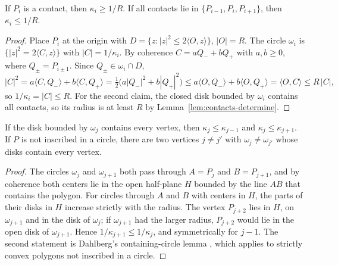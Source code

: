 \begin{lemma}\label{lem:contact-comparison}
If $P_i$ is a contact, then $\kappa_i\ge1/R$. If all contacts lie in
$\{P_{i-1},P_i,P_{i+1}\}$, then $\kappa_i\le1/R$.
\end{lemma}

\begin{proof}
Place $P_i$ at the origin with $D=\{z: |z|^2\le 2\langle O,z\rangle\}$,
$|O|=R$. The circle $\omega_i$ is $\{|z|^2=2\langle C,z\rangle\}$ with $|C|=1/\kappa_i$.
By coherence $C=aQ_-+bQ_+$ with $a,b\ge0$, where $Q_\pm=P_{i\pm1}$. Since
$Q_\pm\in\omega_i\cap D$,
\[
  |C|^2=a\langle C,Q_-\rangle+b\langle C,Q_+\rangle
  =\tfrac12\bigl(a|Q_-|^2+b|Q_+|^2\bigr)
  \le a\langle O,Q_-\rangle+b\langle O,Q_+\rangle=\langle O,C\rangle\le R\,|C| ,
\]
so $1/\kappa_i=|C|\le R$. For the second claim, the closed disk bounded by
$\omega_i$ contains all contacts, so its radius is at least $R$ by
Lemma~\ref{lem:contacts-determine}.
\end{proof}

\begin{lemma}\label{lem:containing}
If the disk bounded by $\omega_j$ contains every vertex, then
$\kappa_j\le\kappa_{j-1}$ and $\kappa_j\le\kappa_{j+1}$. If $P$ is not
inscribed in a circle, there are two vertices $j\ne j'$ with
$\omega_j\ne\omega_{j'}$ whose disks contain every vertex.
\end{lemma}

\begin{proof}
The circles $\omega_j$ and $\omega_{j+1}$ both pass through $A=P_j$ and
$B=P_{j+1}$, and by coherence both centers lie in the open half-plane $H$
bounded by the line $AB$ that contains the polygon. For circles through $A$
and $B$ with centers in $H$, the parts of their disks in $H$ increase strictly
with the radius. The vertex $P_{j+2}$ lies in $H$, on $\omega_{j+1}$ and in the
disk of $\omega_j$; if $\omega_{j+1}$ had the larger radius, $P_{j+2}$ would lie in
the open disk of $\omega_{j+1}$. Hence $1/\kappa_{j+1}\le1/\kappa_j$, and
symmetrically for $j-1$. The second statement is
Dahlberg's containing-circle lemma \cite{Dahlberg2008}, which applies to
strictly convex polygons not inscribed in a circle.
\end{proof}

